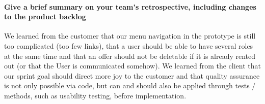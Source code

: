 \paragraph{Give a brief summary on your team's retrospective, including changes to the product backlog}
We learned from the customer that our menu navigation in the prototype is still too
complicated (too few links), that a user should be able to have several roles at the same time
and that an offer should not be deletable if it is already rented out (or that the User is
communicated somehow).
We learned from the client that our sprint goal should direct more joy to the customer and
that quality assurance is not only possible via code, but can and should also be applied
through tests / methods, such as usability testing, before implementation.
